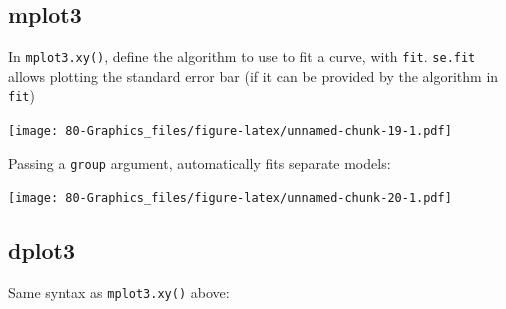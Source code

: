\documentclass[
]{book}
\newenvironment{Shaded}{\begin{snugshade}}{\end{snugshade}}
\newcommand{\AttributeTok}[1]{\textcolor[rgb]{0.77,0.63,0.00}{#1}}
\newcommand{\FunctionTok}[1]{\textcolor[rgb]{0.00,0.00,0.00}{#1}}
\newcommand{\NormalTok}[1]{#1}
\newcommand{\SpecialCharTok}[1]{\textcolor[rgb]{0.00,0.00,0.00}{#1}}
\newcommand{\StringTok}[1]{\textcolor[rgb]{0.31,0.60,0.02}{#1}}
\begin{document}
\hypertarget{mplot3-1}{%
\subsection{\texorpdfstring{\textbf{mplot3}}{mplot3}}\label{mplot3-1}}

In \texttt{mplot3.xy()}, define the algorithm to use to fit a curve, with \texttt{fit}. \texttt{se.fit} allows plotting the standard error bar (if it can be provided by the algorithm in \texttt{fit})

\begin{Shaded}
\end{Shaded}

\texttt{[image: 80-Graphics\_files/figure-latex/unnamed-chunk-19-1.pdf]}

Passing a \texttt{group} argument, automatically fits separate models:

\begin{Shaded}
\end{Shaded}

\texttt{[image: 80-Graphics\_files/figure-latex/unnamed-chunk-20-1.pdf]}

\hypertarget{dplot3-1}{%
\subsection{\texorpdfstring{\textbf{dplot3}}{dplot3}}\label{dplot3-1}}

Same syntax as \texttt{mplot3.xy()} above:

\begin{Shaded}
\end{Shaded}
\end{document}
